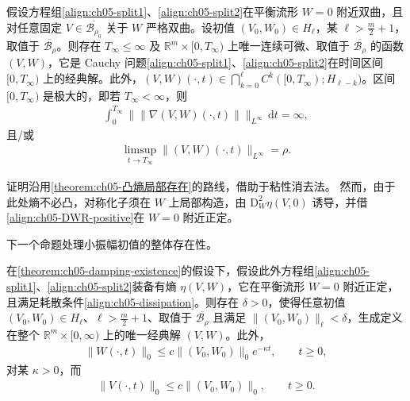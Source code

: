\documentclass[../../main.tex]{subfiles}
\begin{document}
\begin{theorem}\label{theorem:ch05-damping-existence}
假设方程组\eqref{align:ch05-split1}、\eqref{align:ch05-split2}在平衡流形 $W=0$ 附近双曲，且对任意固定 $V\in\overline{\mathscr{B}_{\rho_{0}}}$ 关于 $W$ 严格双曲。设初值 $(V_{0},W_{0})\in H_{\ell}$，某 $\ell>\frac{m}{2}+1$，取值于 $\overline{\mathscr{B}_{\rho}}$。则存在 $T_{\infty}\leqslant\infty$ 及 $\mathbb{R}^{m}\times[0,T_{\infty})$ 上唯一连续可微、取值于 $\overline{\mathscr{B}_{\rho}}$ 的函数 $(V,W)$，它是 Cauchy 问题\eqref{align:ch05-split1}、\eqref{align:ch05-split2}在时间区间 $[0,T_{\infty})$ 上的经典解。此外，$(V,W)(\cdot,t)\in\bigcap_{k=0}^{\ell}C^{k}([0,T_{\infty});H_{\ell-k})$。区间 $[0,T_{\infty})$ 是极大的，即若 $T_{\infty}<\infty$，则
\begin{align}
\int_{0}^{T_{\infty}}\|\|\nabla(V,W)(\cdot,t)\|\|_{L^{\infty}}\,\mathrm{d}t=\infty,\label{align:ch05-damping-blowup1}
\end{align}
且/或
\begin{align}
\limsup_{t\to T_{\infty}}\|(V,W)(\cdot,t)\|_{L^{\infty}}=\rho.\label{align:ch05-damping-blowup2}
\end{align}
\end{theorem}

证明沿用\cref{theorem:ch05-凸熵局部存在}的路线，借助于粘性消去法。
然而，由于此处熵不必凸，对称化子须在 $W$ 上局部构造，由 $\mathrm{D}_{W}^{2}\eta(V,0)$ 诱导，并借\eqref{align:ch05-DWR-positive}在 $W=0$ 附近正定。

下一个命题处理小振幅初值的整体存在性。

\begin{theorem}\label{theorem:ch05-damping-global}
在\cref{theorem:ch05-damping-existence}的假设下，假设此外方程组\eqref{align:ch05-split1}、\eqref{align:ch05-split2}装备有熵 $\eta(V,W)$，它在平衡流形 $W=0$ 附近正定，且满足耗散条件\eqref{align:ch05-dissipation}。则存在 $\delta>0$，使得任意初值 $(V_{0},W_{0})\in H_{\ell}$、$\ell>\frac{m}{2}+1$、取值于 $\overline{\mathscr{B}_{\rho}}$ 且满足 $\|(V_{0},W_{0})\|_{\ell}<\delta$，生成定义在整个 $\mathbb{R}^{m}\times[0,\infty)$ 上的唯一经典解 $(V,W)$。此外，
\begin{align}
\|W(\cdot,t)\|_{0}\leqslant c\|(V_{0},W_{0})\|_{0}e^{-\kappa t},\qquad t\geqslant0,\label{align:ch05-W-decay}
\end{align}
对某 $\kappa>0$，而
\begin{align}
\|V(\cdot,t)\|_{0}\leqslant c\|(V_{0},W_{0})\|_{0},\qquad t\geqslant0.\label{align:ch05-V-bounded}
\end{align}
\end{theorem}
\end{document}
